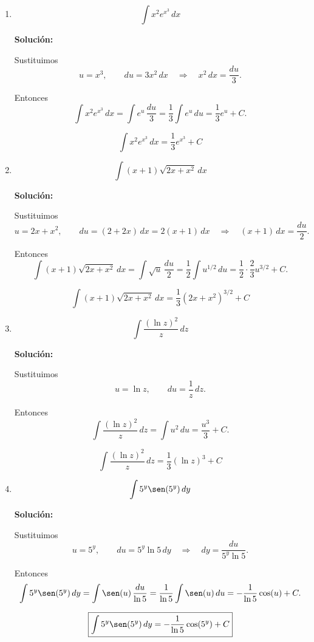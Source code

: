 \documentclass[12pt]{article}
\newcommand{\solucion}{%
    \vspace{0.8em}%
    \textbf{Solución:}%
}
\begin{document}
\begin{enumerate}[label=\alph*.-]

    \item
    \[
    \int x^2e^{x^3}\,dx
    \]

    \solucion

    Sustituimos
    \[
    u=x^3,\qquad du=3x^2\,dx\quad\Rightarrow\quad x^2\,dx=\frac{du}{3}.
    \]

    Entonces
    \[
    \int x^2e^{x^3}\,dx=\int e^u\,\frac{du}{3}=\frac13\int e^u\,du=\frac13e^u+C.
    \]

    \[
    \boxed{
    \int x^2e^{x^3}\,dx=\frac13e^{x^3}+C
    }
    \]


    \item
    \[
    \int(x+1)\sqrt{2x+x^2}\,dx
    \]

    \solucion

    Sustituimos
    \[
    u=2x+x^2,\qquad du=(2+2x)\,dx=2(x+1)\,dx
    \quad\Rightarrow\quad (x+1)\,dx=\frac{du}{2}.
    \]

    Entonces
    \[
    \int(x+1)\sqrt{2x+x^2}\,dx=\int\sqrt{u}\,\frac{du}{2}
    =\frac12\int u^{1/2}\,du
    =\frac12\cdot\frac{2}{3}u^{3/2}+C.
    \]

    \[
    \boxed{
    \int(x+1)\sqrt{2x+x^2}\,dx=\frac13\left(2x+x^2\right)^{3/2}+C
    }
    \]


    \item
    \[
    \int\frac{(\ln z)^2}{z}\,dz
    \]

    \solucion

    Sustituimos
    \[
    u=\ln z,\qquad du=\frac{1}{z}\,dz.
    \]

    Entonces
    \[
    \int\frac{(\ln z)^2}{z}\,dz=\int u^2\,du=\frac{u^3}{3}+C.
    \]

    \[
    \boxed{
    \int\frac{(\ln z)^2}{z}\,dz=\frac13(\ln z)^3+C
    }
    \]


    \item
    \[
    \int 5^y\sen(5^y)\,dy
    \]

    \solucion

    Sustituimos
    \[
    u=5^y,\qquad du=5^y\ln 5\,dy\quad\Rightarrow\quad dy=\frac{du}{5^y\ln5}.
    \]

    Entonces
    \[
    \int 5^y\sen(5^y)\,dy=\int\sen(u)\,\frac{du}{\ln5}
    =\frac{1}{\ln5}\int\sen(u)\,du
    =-\frac{1}{\ln5}\cos(u)+C.
    \]

    \[
    \boxed{
    \int 5^y\sen(5^y)\,dy=-\frac{1}{\ln5}\cos\!\left(5^y\right)+C
    }
    \]



\end{enumerate}
\end{document}
